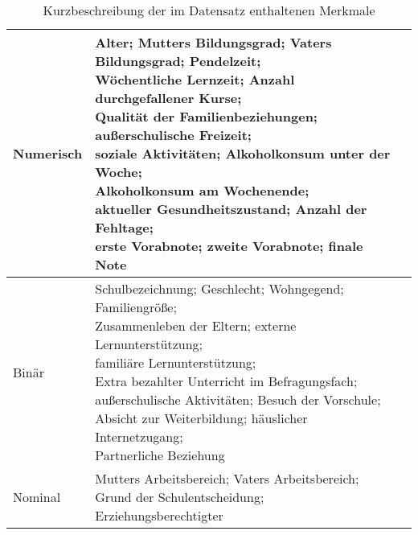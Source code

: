 \begin{table}[htb]
    \centering
    \caption{Kurzbeschreibung der im Datensatz enthaltenen Merkmale}
    \begin{tabular}{|l|l|l|}
    \hline
        Numerisch & \makecell[l]{Alter; Mutters Bildungsgrad; Vaters Bildungsgrad; Pendelzeit; \\Wöchentliche Lernzeit; Anzahl durchgefallener Kurse; \\Qualität der Familienbeziehungen; außerschulische Freizeit; \\soziale Aktivitäten; Alkoholkonsum unter der Woche; \\Alkoholkonsum am Wochenende; \\aktueller Gesundheitszustand; Anzahl der Fehltage; \\\textbf{erste Vorabnote; zweite Vorabnote; finale Note}} \\ \hline
        Binär & \makecell[l]{Schulbezeichnung; Geschlecht; Wohngegend; Familiengröße; \\Zusammenleben der Eltern; externe Lernunterstützung; \\familiäre Lernunterstützung; \\Extra bezahlter Unterricht im Befragungsfach; \\außerschulische Aktivitäten; Besuch der Vorschule; \\Absicht zur Weiterbildung; häuslicher Internetzugang; \\Partnerliche Beziehung} \\ \hline
        Nominal & \makecell[l]{Mutters Arbeitsbereich; Vaters Arbeitsbereich; \\Grund der Schulentscheidung; Erziehungsberechtigter} \\ \hline
    \end{tabular}
\end{table}